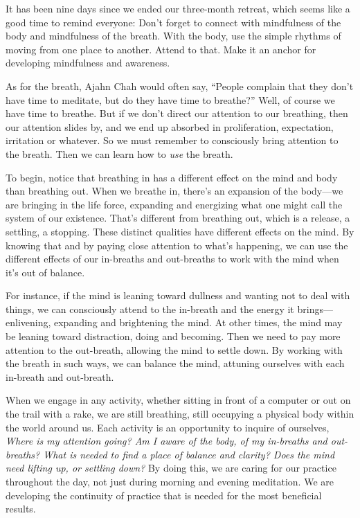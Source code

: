 It has been nine days since we ended our three-month retreat, which 
seems like a good time to remind everyone: Don't forget to connect with 
mindfulness of the body and mindfulness of the breath. With the body, 
use the simple rhythms of moving from one place to another. Attend to 
that. Make it an anchor for developing mindfulness and awareness.

As for the breath, Ajahn Chah would often say, ``People complain that 
they don't have time to meditate, but do they have time to breathe?'' 
Well, of course we have time to breathe. But if we don't direct our 
attention to our breathing, then our attention slides by, and we end up 
absorbed in proliferation, expectation, irritation or whatever. So we 
must remember to consciously bring attention to the breath. Then we can 
learn how to \emph{use} the breath.

To begin, notice that breathing in has a different effect on the mind 
and body than breathing out. When we breathe in, there's an expansion 
of the body---we are bringing in the life force, expanding and 
energizing what one might call the system of our existence. That's 
different from breathing out, which is a release, a settling, a 
stopping. These distinct qualities have different effects on the mind. 
By knowing that and by paying close attention to what's happening, we 
can use the different effects of our in-breaths and out-breaths to work 
with the mind when it's out of balance.

For instance, if the mind is leaning toward dullness and wanting not to 
deal with things, we can consciously attend to the in-breath and the 
energy it brings---enlivening, expanding and brightening the mind. At 
other times, the mind may be leaning toward distraction, doing and 
becoming. Then we need to pay more attention to the out-breath, 
allowing the mind to settle down. By working with the breath in such 
ways, we can balance the mind, attuning ourselves with each in-breath 
and out-breath.

When we engage in any activity, whether sitting in front of a computer 
or out on the trail with a rake, we are still breathing, still 
occupying a physical body within the world around us. Each activity is 
an opportunity to inquire of ourselves, \emph{Where is my attention 
going? Am I aware of the body, of my in-breaths and out-breaths? What 
is needed to find a place of balance and clarity? Does the mind need 
lifting up, or settling down?} By doing this, we are caring for our 
practice throughout the day, not just during morning and evening 
meditation. We are developing the continuity of practice that is needed 
for the most beneficial results.

